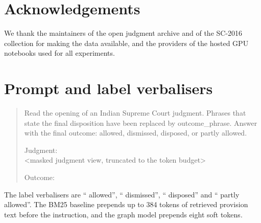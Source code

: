\documentclass[11pt,a4paper]{article}
\begin{document}
\section*{Acknowledgements}
We thank the maintainers of the open judgment archive and of the SC-2016 collection for making the data available, and the providers of the hosted GPU notebooks used for all experiments.

\appendix
\section{Prompt and label verbalisers}\label{app:prompt}
\begin{quote}\small
Read the opening of an Indian Supreme Court judgment. Phrases that state the final disposition have been replaced by outcome\_phrase. Answer with the final outcome: allowed, dismissed, disposed, or partly allowed.

Judgment:\\
\textless masked judgment view, truncated to the token budget\textgreater

Outcome:
\end{quote}
The label verbalisers are `` allowed'', `` dismissed'', `` disposed'' and `` partly allowed''. The BM25 baseline prepends up to 384 tokens of retrieved provision text before the instruction, and the graph model prepends eight soft tokens.

{\small{}}
\end{document}
